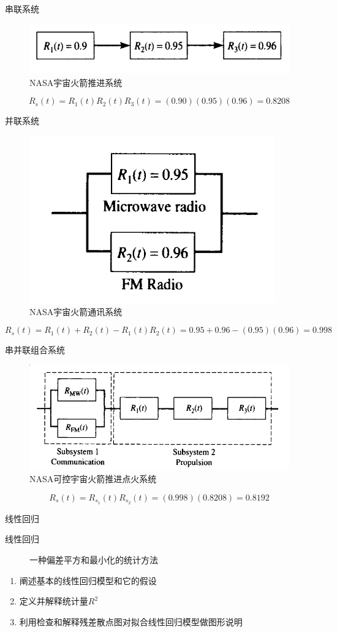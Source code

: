 \documentclass[mathserif, table]{beamer}
\begin{document}
\begin{frame}{串联系统}
  \begin{figure}
    \centering
    \includegraphics[width=.5\textwidth{}]{nasa.png}
    \caption{NASA宇宙火箭推进系统}
  \end{figure}

  \[
  R_s(t) = R_1(t)R_2(t)R_3(t) = (0.90)(0.95)(0.96) = 0.8208
  \]
  
\end{frame}

\begin{frame}{并联系统}
  \begin{figure}
    \centering
    \includegraphics[width=.4\textwidth{}]{nasa-comm.png}
    \caption{NASA宇宙火箭通讯系统}
  \end{figure}

  \[
  R_s(t) = R_1(t) + R_2(t) - R_1(t)R_2(t) = 0.95 + 0.96 - (0.95)(0.96) = 0.998
  \]
  
\end{frame}

\begin{frame}{串并联组合系统}
  \begin{figure}
    \centering
    \includegraphics[width=.5\textwidth{}]{nasa-total.png}
    \caption{NASA可控宇宙火箭推进点火系统}
  \end{figure}

  \[
  R_s(t) = R_{s_1}(t)R_{s_2}(t) = (0.998)(0.8208) = 0.8192
  \]
  
\end{frame}

\begin{frame}{线性回归}
  \begin{description}
  \item[线性回归] 一种偏差平方和最小化的统计方法
  \end{description}
  
  \begin{enumerate}
  \item 阐述基本的线性回归模型和它的假设
  \item 定义并解释统计量$R^2$
  \item 利用检查和解释残差散点图对拟合线性回归模型做图形说明
  \end{enumerate}
  
\end{frame}
\end{document}
